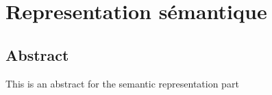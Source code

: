 \part{Representation sémantique}

\chapter*{Abstract}
This is an abstract for the semantic representation part 



%
%
